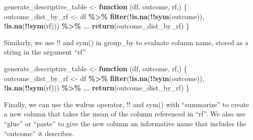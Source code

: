 \documentclass[
]{book}
\newenvironment{Shaded}{\begin{snugshade}}{\end{snugshade}}
\newcommand{\ControlFlowTok}[1]{\textcolor[rgb]{0.13,0.29,0.53}{\textbf{#1}}}
\newcommand{\FunctionTok}[1]{\textcolor[rgb]{0.13,0.29,0.53}{\textbf{#1}}}
\newcommand{\NormalTok}[1]{#1}
\newcommand{\OtherTok}[1]{\textcolor[rgb]{0.56,0.35,0.01}{#1}}
\newcommand{\SpecialCharTok}[1]{\textcolor[rgb]{0.81,0.36,0.00}{\textbf{#1}}}
\begin{document}
\begin{Shaded}
\begin{Highlighting}[]
\NormalTok{generate\_descriptive\_table }\OtherTok{\textless{}{-}} \ControlFlowTok{function}\NormalTok{ (df, outcome, rf,) \{}
\NormalTok{  outcome\_dist\_by\_rf }\OtherTok{\textless{}{-}}\NormalTok{ df }\SpecialCharTok{\%\textgreater{}\%} 
  \FunctionTok{filter}\NormalTok{(}\SpecialCharTok{!}\FunctionTok{is.na}\NormalTok{(}\SpecialCharTok{!!}\FunctionTok{sym}\NormalTok{(outcome)), }\SpecialCharTok{!}\FunctionTok{is.na}\NormalTok{(}\SpecialCharTok{!!}\FunctionTok{sym}\NormalTok{(rf))) }\SpecialCharTok{\%\textgreater{}\%}
\NormalTok{  ….}
  \FunctionTok{return}\NormalTok{(outcome\_dist\_by\_rf)}
\NormalTok{\}}
\end{Highlighting}
\end{Shaded}

Similarly, we use !! and sym() in group\_by to evaluate column name, stored as a string in the argument ``rf''

\begin{Shaded}
\begin{Highlighting}[]
\NormalTok{generate\_descriptive\_table }\OtherTok{\textless{}{-}} \ControlFlowTok{function}\NormalTok{ (df, outcome, rf,) \{}
\NormalTok{  outcome\_dist\_by\_rf }\OtherTok{\textless{}{-}}\NormalTok{ df }\SpecialCharTok{\%\textgreater{}\%} 
  \FunctionTok{filter}\NormalTok{(}\SpecialCharTok{!}\FunctionTok{is.na}\NormalTok{(}\SpecialCharTok{!!}\FunctionTok{sym}\NormalTok{(outcome)), }\SpecialCharTok{!}\FunctionTok{is.na}\NormalTok{(}\SpecialCharTok{!!}\FunctionTok{sym}\NormalTok{(rf))) }\SpecialCharTok{\%\textgreater{}\%}
\NormalTok{  ….}
  \FunctionTok{return}\NormalTok{(outcome\_dist\_by\_rf)}
\NormalTok{\}}
\end{Highlighting}
\end{Shaded}

Finally, we can use the walrus operator, !! and sym() with ``summarize'' to create a new column that takes the mean of the column referenced in ``rf''. We also use ``glue'' or ``paste'' to give the new column an informative name that includes the ``outcome'' it describes.
\end{document}
